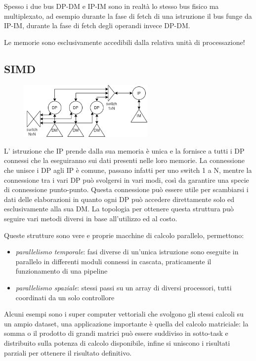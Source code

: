 Spesso i due bus DP-DM e IP-IM sono in realtà lo stesso bus fisico ma multiplexato, ad esempio durante la fase di fetch di una istruzione il bus funge da IP-IM, durante la fase di fetch degli operandi invece DP-DM.

Le memorie sono esclusivamente accedibili dalla relativa unità di processazione!

\subsection{SIMD}
\begin{figure}[H]
    \centering
    \includegraphics[width=250px]{images/2_Tassonomia_di_Flynn/SIMD.png}
\end{figure}
L' istruzione che IP prende dalla sua memoria è unica e la fornisce a tutti i DP connessi che la eseguiranno sui dati presenti nelle loro memorie.
La connessione che unisce i DP agli IP è comune, passano infatti per uno switch 1 a N, mentre la connessione tra i vari DP può svolgersi in vari modi, così da garantire una specie di connessione punto-punto. Questa connessione può essere utile per scambiarsi i dati delle elaborazioni in quanto ogni DP può accedere direttamente solo ed esclusivamente alla sua DM. La topologia per ottenere questa struttura può seguire vari metodi diversi in base all'utilizzo ed al costo.

Queste strutture sono vere e proprie macchine di calcolo parallelo, permettono:
\begin{itemize}
    \item \emph{parallelismo temporale}: fasi diverse di un'unica istruzione sono eseguite in parallelo in differenti moduli connessi in cascata, praticamente il funzionamento di una pipeline
    \item \emph{parallelismo spaziale}: stessi passi su un array di diversi processori, tutti coordinati da un solo controllore
\end{itemize}

Alcuni esempi sono i super computer vettoriali che svolgono gli stessi calcoli su un ampio dataset, una applicazione importante è quella del calcolo matriciale: la somma o il prodotto di grandi matrici può essere suddiviso in sotto-task e distribuito sulla potenza di calcolo disponibile, infine si uniscono i risultati parziali per ottenere il risultato definitivo.

